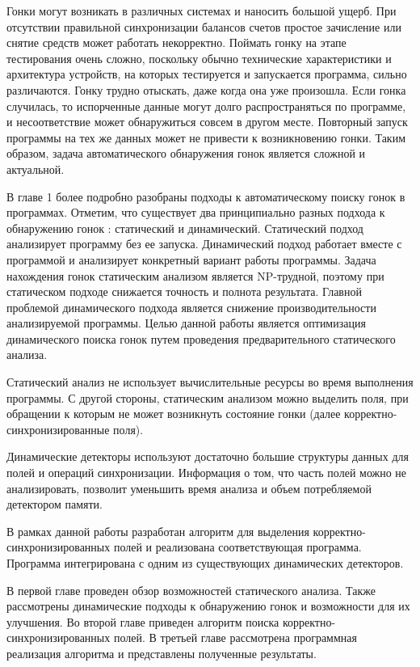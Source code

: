 Гонки могут возникать в различных системах и наносить большой ущерб. При отсутствии правильной синхронизации балансов счетов простое зачисление или снятие средств может работать некорректно. Поймать гонку на этапе тестирования очень сложно, поскольку обычно технические характеристики и архитектура устройств, на которых тестируется и запускается программа, сильно различаются. Гонку трудно отыскать, даже когда она уже произошла. Если гонка случилась, то испорченные данные могут долго распространяться по программе, и несоответствие может обнаружиться совсем в другом месте. Повторный запуск программы на тех же данных может не привести к возникновению гонки. Таким образом, задача автоматического обнаружения гонок является
сложной и актуальной.

В главе 1 более подробно разобраны подходы к автоматическому поиску гонок в программах. Отметим, что существует два принципиально разных подхода к обнаружению гонок : статический и динамический. Статический подход  анализирует программу без ее запуска. Динамический подход работает вместе с программой и анализирует конкретный вариант работы программы. Задача нахождения гонок статическим анализом является NP-трудной, поэтому при статическом подходе снижается точность и полнота результата. Главной проблемой динамического подхода является снижение производительности анализируемой программы. Целью данной работы является оптимизация динамического поиска гонок путем проведения предварительного статического анализа. 

Статический анализ не использует вычислительные ресурсы во время выполнения программы. С другой стороны, статическим анализом можно выделить поля, при обращении к которым не может возникнуть состояние гонки (далее корректно-синхронизированные поля).

Динамические детекторы используют достаточно большие структуры данных для полей и операций синхронизации. Информация о том, что часть полей можно не анализировать, позволит уменьшить время анализа и объем потребляемой детектором памяти.

В рамках данной работы разработан алгоритм для выделения корректно-синхронизированных полей и реализована соответствующая программа. Программа интегрирована с одним из существующих динамических детекторов.

В первой главе проведен обзор возможностей статического анализа. Также рассмотрены динамические подходы к обнаружению гонок и возможности для их улучшения. Во второй главе приведен алгоритм поиска корректно-синхронизированных полей. В третьей главе рассмотрена программная реализация алгоритма и представлены полученные результаты.
\FloatBarrier
